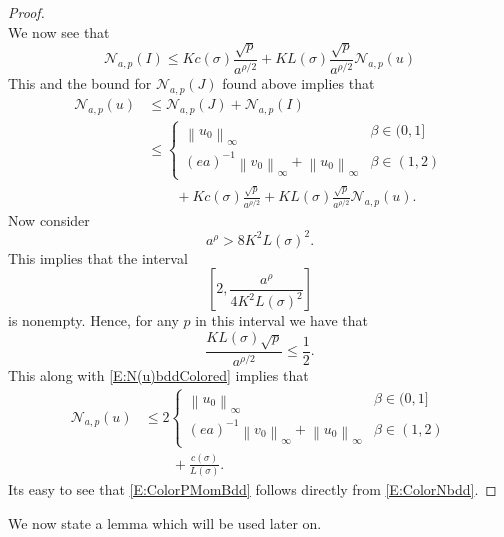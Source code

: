 \documentclass[a4paper,11pt]{article}
\numberwithin{equation}{section}
\theoremstyle{plain}
\theoremstyle{definition}
\newcommand{\Norm}[1]{\left\|  #1   \right\|}
\numberwithin{NQ}{section}
\numberwithin{LQ}{section}
\numberwithin{ZQ}{section}
\begin{document}
\begin{proof}
\[		\] 
		We now see that 
		\begin{equation}
		\mathcal{N}_{a,p}(I)\le K c(\sigma)\frac{\sqrt{p}}{ a^{\rho /2}} + K L(\sigma) \frac{\sqrt{p}}{ a^{\rho/2}} \mathcal{N}_{a,p}(u)
		\end{equation}
		This and the bound for $\mathcal{N}_{a,p}(J)$ found above implies that 
		\begin{align}
		\mathcal{N}_{a,p}(u) &\le \mathcal{N}_{a,p}(J) + \mathcal{N}_{a,p}(I) \nonumber \\
		& \le \begin{cases}
		\Norm{u_0}_{\infty} & \beta \in (0,1] \nonumber \\
		(ea)^{-1}\Norm{v_0}_{\infty} + \Norm{u_0}_{\infty} & \beta \in (1,2)
		\end{cases} \\
		& \qquad + K c(\sigma)\frac{\sqrt{p}}{ a^{\rho /2}} + K L(\sigma) \frac{\sqrt{p}}{ a^{\rho/2}} \mathcal{N}_{a,p}(u) \label{E:N(u)bddColored}.
		\end{align}
		Now consider 
		\[
		a^\rho > 8K^2L(\sigma)^2.
		\]
		This implies that the interval 
		\[
		\left[2, \frac{a^\rho}{4K^2L(\sigma)^2}  \right]
		\]
		is nonempty. Hence, for any $p$ in this interval we have that 
		\[
		\frac{KL(\sigma)\sqrt{p}}{a^{\rho/2}} \le \frac{1}{2}.
		\]
		This along with \eqref{E:N(u)bddColored} implies that 
		\begin{align*}
		\mathcal{N}_{a,p}(u) &\le 2\begin{cases}
		\Norm{u_0}_{\infty} & \beta \in (0,1] \nonumber \\
		(ea)^{-1}\Norm{v_0}_{\infty} + \Norm{u_0}_{\infty} & \beta \in (1,2)
		\end{cases} \\
		& \qquad + \frac{c(\sigma)}{L(\sigma)}.
		\end{align*}
		Its easy to see that \eqref{E:ColorPMomBdd} follows directly from \eqref{E:ColorNbdd}. 
	\end{proof}

We now state a lemma which will be used later on. 
\end{document}
